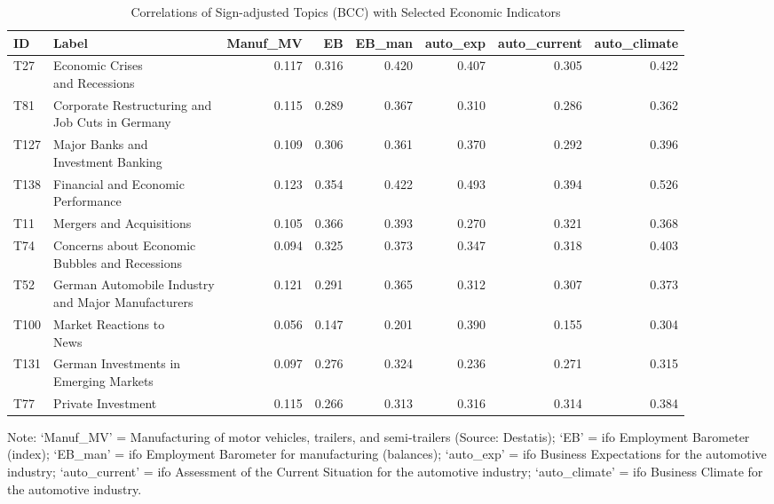 \begin{table}[h!]
  \centering
  \begin{threeparttable}
    \scriptsize
    \renewcommand{\arraystretch}{1.3}
  \caption{Correlations of Sign-adjusted Topics (BCC) with Selected Economic Indicators}
  \label{tab:cor_gdp_topics_bcc_2009_200_all_economic_indicators}


\begin{tabular}{llrrrrrr}
\hline
ID & Label & Manuf\_MV & EB & EB\_man & auto\_exp & auto\_current & auto\_climate\\
\hline
T27 & \makecell[tl]{ Economic Crises \\ and Recessions} & 0.117 & 0.316 & 0.420 & 0.407 & 0.305 & 0.422\\
T81 & \makecell[tl]{ Corporate Restructuring and \\ Job Cuts in Germany} & 0.115 & 0.289 & 0.367 & 0.310 & 0.286 & 0.362\\
T127 & \makecell[tl]{ Major Banks and \\ Investment Banking} & 0.109 & 0.306 & 0.361 & 0.370 & 0.292 & 0.396\\
T138 & \makecell[tl]{ Financial and Economic \\ Performance} & 0.123 & 0.354 & 0.422 & 0.493 & 0.394 & 0.526\\
T11 & Mergers and Acquisitions & 0.105 & 0.366 & 0.393 & 0.270 & 0.321 & 0.368\\
\addlinespace
T74 & \makecell[tl]{ Concerns about Economic\\ Bubbles and Recessions} & 0.094 & 0.325 & 0.373 & 0.347 & 0.318 & 0.403\\
T52 & \makecell[tl]{ German Automobile Industry \\ and Major Manufacturers} & 0.121 & 0.291 & 0.365 & 0.312 & 0.307 & 0.373\\
T100 & \makecell[tl]{ Market Reactions to \\News} & 0.056 & 0.147 & 0.201 & 0.390 & 0.155 & 0.304\\
T131 & \makecell[tl]{German Investments in \\ Emerging Markets} & 0.097 & 0.276 & 0.324 & 0.236 & 0.271 & 0.315\\
T77 & Private Investment & 0.115 & 0.266 & 0.313 & 0.316 & 0.314 & 0.384\\
\hline
\end{tabular}

    \begin{tablenotes}[flushleft]
      \small \item Note: ‘Manuf\_MV’ = Manufacturing of motor vehicles, trailers, and semi-trailers (Source: Destatis); ‘EB’ = ifo Employment Barometer (index); ‘EB\_man’ = ifo Employment Barometer for manufacturing (balances); ‘auto\_exp’ = ifo Business Expectations for the automotive industry; ‘auto\_current’ = ifo Assessment of the Current Situation for the automotive industry; ‘auto\_climate’ = ifo Business Climate for the automotive industry.
    \end{tablenotes}
  \end{threeparttable}
\end{table}

